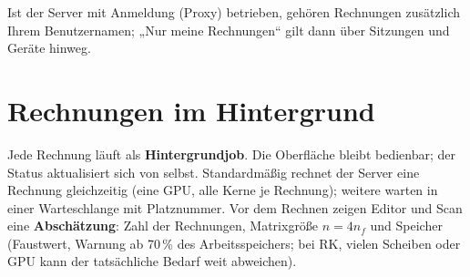 Ist der Server mit Anmeldung (Proxy) betrieben, gehören Rechnungen zusätzlich Ihrem Benutzernamen; „Nur meine
Rechnungen“ gilt dann über Sitzungen und Geräte hinweg.

\section{Rechnungen im Hintergrund}
Jede Rechnung läuft als \textbf{Hintergrundjob}. Die Oberfläche bleibt bedienbar; der Status aktualisiert sich von
selbst. Standardmäßig rechnet der Server eine Rechnung gleichzeitig (eine GPU, alle Kerne je Rechnung); weitere warten
in einer Warteschlange mit Platznummer. Vor dem Rechnen zeigen Editor und Scan eine \textbf{Abschätzung}: Zahl der
Rechnungen, Matrixgröße $n=4n_f$ und Speicher (Faustwert, Warnung ab 70\,\% des Arbeitsspeichers; bei RK, vielen
Scheiben oder GPU kann der tatsächliche Bedarf weit abweichen).

